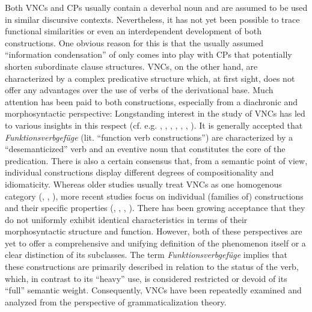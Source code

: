 \documentclass[output=paper,colorlinks,citecolor=brown]{langscibook}
\begin{document}
Both VNCs and CPs usually contain a deverbal noun and are assumed to be used in similar discursive contexts. Nevertheless, it has not yet been possible to trace functional similarities or even an interdependent development of both constructions. One obvious reason for this is that the usually assumed ``information condensation'' of  only comes into play with CPs that potentially shorten subordinate clause structures. VNCs, on the other hand, are characterized by a complex predicative structure which, at first sight, does not offer any advantages over the use of verbs of the derivational base. Much attention has been paid to both constructions, especially from a diachronic and morphosyntactic perspective: Longstanding interest in the study of  VNCs has led to various insights in this respect (cf. e.g. \citealt{Pottelberge2001}, \citealt{Seifert2004}, \citealt{Kamber2008}, \citealt{Kabatnik2020}, \citealt{Harm2021}, \citealt{FleischhauerHartmann2021}, \citealt{Fleischhauer2022}). It is generally accepted that  \textit{Funktionsverbgefüge} (lit. ``function verb constructions'') are characterized by a ``desemanticized'' verb and an eventive noun that constitutes the core of the predication. There is also a certain consensus that, from a semantic point of view, individual constructions display different degrees of compositionality and idiomaticity. Whereas older studies usually treat  VNCs as one homogenous category (\citealt{Polenz1987}, \citealt{Helbig1979}, \citealt{Kamber2008}), more recent studies focus on individual (families of) constructions and their specific properties (\citealt{Zeschel2008}, \citealt{Kabatnik2020}, \citealt{Fleischhauer2022}, \citealt{Smirnova2022}). There has been growing acceptance that they do not uniformly exhibit identical characteristics in terms of their morphosyntactic structure and function. However, both of these perspectives are yet to offer a comprehensive and unifying definition of the phenomenon itself or a clear distinction of its subclasses. The term \textit{Funktionsverbgefüge} implies that these constructions are primarily described in relation to the status of the verb, which, in contrast to its ``heavy'' use, is considered restricted or devoid of its ``full'' semantic weight. Consequently, VNCs have been repeatedly examined and analyzed from the perspective of grammaticalization theory. 
\end{document}
